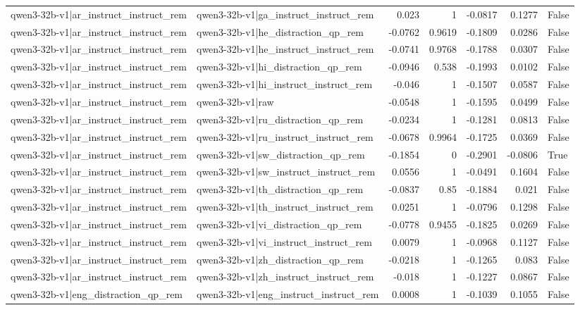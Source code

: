 \begin{table}
\begin{tabular}{l l r r r r l}
qwen3-32b-v1|ar_instruct_instruct_rem & qwen3-32b-v1|ga_instruct_instruct_rem & 0.023 & 1 & -0.0817 & 0.1277 & False \\
qwen3-32b-v1|ar_instruct_instruct_rem & qwen3-32b-v1|he_distraction_qp_rem & -0.0762 & 0.9619 & -0.1809 & 0.0286 & False \\
qwen3-32b-v1|ar_instruct_instruct_rem & qwen3-32b-v1|he_instruct_instruct_rem & -0.0741 & 0.9768 & -0.1788 & 0.0307 & False \\
qwen3-32b-v1|ar_instruct_instruct_rem & qwen3-32b-v1|hi_distraction_qp_rem & -0.0946 & 0.538 & -0.1993 & 0.0102 & False \\
qwen3-32b-v1|ar_instruct_instruct_rem & qwen3-32b-v1|hi_instruct_instruct_rem & -0.046 & 1 & -0.1507 & 0.0587 & False \\
qwen3-32b-v1|ar_instruct_instruct_rem & qwen3-32b-v1|raw & -0.0548 & 1 & -0.1595 & 0.0499 & False \\
qwen3-32b-v1|ar_instruct_instruct_rem & qwen3-32b-v1|ru_distraction_qp_rem & -0.0234 & 1 & -0.1281 & 0.0813 & False \\
qwen3-32b-v1|ar_instruct_instruct_rem & qwen3-32b-v1|ru_instruct_instruct_rem & -0.0678 & 0.9964 & -0.1725 & 0.0369 & False \\
qwen3-32b-v1|ar_instruct_instruct_rem & qwen3-32b-v1|sw_distraction_qp_rem & -0.1854 & 0 & -0.2901 & -0.0806 & True \\
qwen3-32b-v1|ar_instruct_instruct_rem & qwen3-32b-v1|sw_instruct_instruct_rem & 0.0556 & 1 & -0.0491 & 0.1604 & False \\
qwen3-32b-v1|ar_instruct_instruct_rem & qwen3-32b-v1|th_distraction_qp_rem & -0.0837 & 0.85 & -0.1884 & 0.021 & False \\
qwen3-32b-v1|ar_instruct_instruct_rem & qwen3-32b-v1|th_instruct_instruct_rem & 0.0251 & 1 & -0.0796 & 0.1298 & False \\
qwen3-32b-v1|ar_instruct_instruct_rem & qwen3-32b-v1|vi_distraction_qp_rem & -0.0778 & 0.9455 & -0.1825 & 0.0269 & False \\
qwen3-32b-v1|ar_instruct_instruct_rem & qwen3-32b-v1|vi_instruct_instruct_rem & 0.0079 & 1 & -0.0968 & 0.1127 & False \\
qwen3-32b-v1|ar_instruct_instruct_rem & qwen3-32b-v1|zh_distraction_qp_rem & -0.0218 & 1 & -0.1265 & 0.083 & False \\
qwen3-32b-v1|ar_instruct_instruct_rem & qwen3-32b-v1|zh_instruct_instruct_rem & -0.018 & 1 & -0.1227 & 0.0867 & False \\
qwen3-32b-v1|eng_distraction_qp_rem & qwen3-32b-v1|eng_instruct_instruct_rem & 0.0008 & 1 & -0.1039 & 0.1055 & False \\

\end{tabular}
\end{table}
